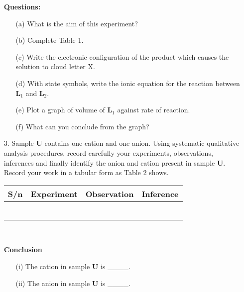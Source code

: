 \begin{enumerate}
\textbf{Questions:}
\begin{enumerate}
\item[(a)] What is the aim of this experiment?
\item[(b)] Complete Table 1.
\item[(c)] Write the electronic configuration of the product which causes the solution to cloud letter X.
\item[(d)] With state symbols, write the ionic equation for the reaction between \textbf{L$_1$} and \textbf{L$_2$}.
\item[(e)] Plot a graph of volume of \textbf{L$_1$} against rate of reaction.
\item[(f)] What can you conclude from the graph?\\
\end{enumerate}

\item[3.] Sample \textbf{U} contains one cation and one anion. Using systematic qualitative analysis procedures, record carefully your experiments, observations, inferences and finally identify the anion and cation present in sample \textbf{U}. Record your work in a tabular form as Table 2 shows.\\

\begin{center}
\begin{tabular}{|p{1cm}|p{5cm}|p{3cm}|p{3cm}|}
\hline
\textbf{S/n}&\textbf{Experiment}&\textbf{Observation}&\textbf{Inference}\\ \hline
&&&\\
&&&\\
&&&\\
&&&\\
&&&\\
&&&\\
\hline
\end{tabular}\\
\end{center}

\textbf{Conclusion}
\begin{enumerate}
\item[(i)] The cation in sample \textbf{U} is \_\_\_\_.
\item[(ii)] The anion in sample \textbf{U} is \_\_\_\_.
\end{enumerate}

\end{enumerate}